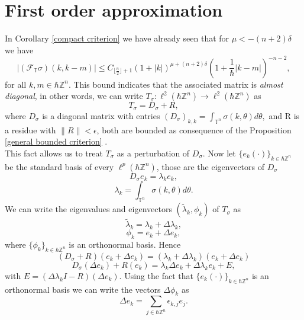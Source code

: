 \documentclass[pdflatex,sn-mathphys-num]{sn-jnl}%
\theoremstyle{thmstyleone}%
\theoremstyle{thmstyletwo}%
\theoremstyle{thmstylethree}%
\begin{document}
\section{First order approximation}\label{section approximation}
In Corollary \ref{compact criterion} we have already seen that for $\mu< -(n+2)\delta$ we have 
\[  \left| (\mathcal{F}_{\mathbb{T}} \sigma)(k,k-m) \right| \leq C_{\lfloor\frac{n}{2}\rfloor +1}  ( 1+|k| )^{\mu+(n+2)\delta}\left( 1+\frac{1}{\hbar}|k-m| \right)^{-n-2},\]
for all $k,m\in \hbar\mathbb{Z}^n $. This bound indicates that the associated matrix is \textit{almost diagonal}, in other words, we can write $T_\sigma:\ell^{2}(\hbar\mathbb{Z}^n)\to\ell^{2}(\hbar\mathbb{Z}^n)$ as 
\[T_\sigma=D_\sigma+R,\]
where $D_\sigma$ is a diagonal matrix with entries 
$(D_\sigma)_{k,k}=\int_{\mathbb{T}^n} \sigma(k,\theta)d\theta,$
and R is a residue with $\|R\|<\epsilon$, both are bounded as consequence of the Proposition \ref{general bounded criterion} .\\
This fact allows us to treat $T_\sigma$ as a perturbation of $D_\sigma$. Now let $\{e_k(\cdot)\}_{k\in\hbar\mathbb{Z}^n}$ be the standard basis of every $\ell^p(\hbar\mathbb{Z}^n)$, those are the eigenvectors of $D_\sigma$
\[D_\sigma e_k=\lambda_k e_k,\]
\[\lambda_k=\int_{\mathbb{T}^n} \sigma(k,\theta)d\theta. \]
We can write the eigenvalues and eigenvectors $(\widetilde{\lambda}_k,\phi_k)$ of $T_\sigma$ as
\[\widetilde{\lambda}_k=\lambda_k +\Delta\lambda_k,\]
\[\phi_k=e_k +\Delta e_k,\]
where $\{\phi_k\}_{k\in\hbar\mathbb{Z}^n}$ is an orthonormal basis. Hence
\[(D_\sigma+R )(e_k+\Delta e_k)=(\lambda_k+\Delta\lambda_k)(e_k+\Delta e_k)\]
\begin{equation}\label{EigenAprox}D_\sigma(\Delta e_k)+R(e_k)=\lambda_k\Delta 
e_k+\Delta\lambda_k e_k+E,
\end{equation}
with $E=(\Delta\lambda_kI-R)(\Delta e_k)$. Using the fact that $\{e_k(\cdot)\}_{k\in\hbar\mathbb{Z}^n}$ is an orthonormal basis we can write the vectors $\Delta\phi_k$ as
\[ \Delta e_k=\sum_{j\in\hbar\mathbb{Z}^n} \epsilon_{k,j} e_j.  \]
\end{document}

